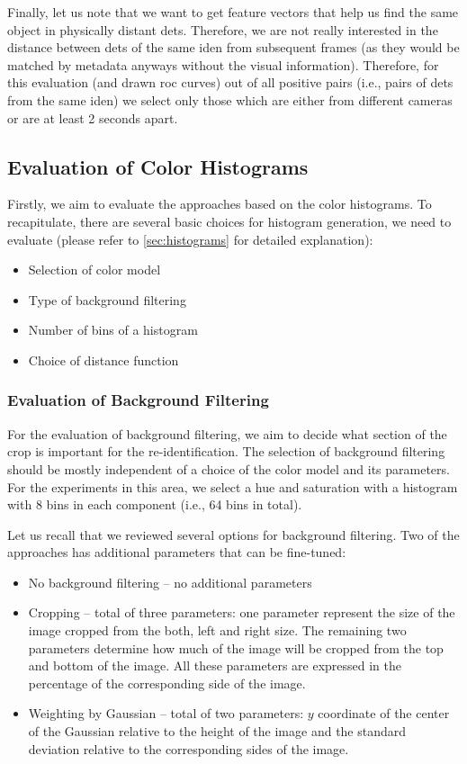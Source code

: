 Finally, let us note that we want to get feature vectors that help us find the same object in physically distant \glspl{det}. Therefore, we are not really interested in the distance between \glspl{det} of the same \gls{iden} from subsequent frames (as they would be matched by metadata anyways without the visual information). Therefore, for this evaluation (and drawn \gls{roc} curves) out of all positive pairs (i.e., pairs of \glspl{det} from the same \gls{iden}) we select only those which are either from different cameras or are at least 2 seconds apart.

\subsection{Evaluation of Color Histograms}

Firstly, we aim to evaluate the approaches based on the color histograms. To recapitulate, there are several basic choices
for histogram generation, we need to evaluate (please refer to
\autoref{sec:histograms} for detailed explanation):

\begin{itemize}
    \item Selection of color model
    \item Type of background filtering
    \item Number of bins of a histogram
    \item Choice of distance function
\end{itemize}

\subsubsection{Evaluation of Background Filtering}

For the evaluation of background filtering, we
aim to decide what section of the crop is important for the re-identification. The selection of background filtering should be mostly independent of
a choice of the color model and its parameters. For the experiments in this
area, we select a hue and saturation with a histogram with 8 bins in
each component (i.e., 64 bins in total).

Let us recall that we reviewed several options for background filtering. Two of the approaches has additional parameters that can be fine-tuned:

\begin{itemize}
    \item No background filtering -- no additional parameters
    \item Cropping -- total of three parameters: one parameter represent the size of the image cropped from the both, left and right size. The remaining two parameters determine how much of the image will be cropped from the top and bottom of the image. All these parameters are expressed in the percentage of the corresponding side of the image.
    \item Weighting by Gaussian -- total of two parameters: $y$ coordinate of the center of the Gaussian relative to the height of the image and the standard deviation relative to the corresponding sides of the image.
\end{itemize}

